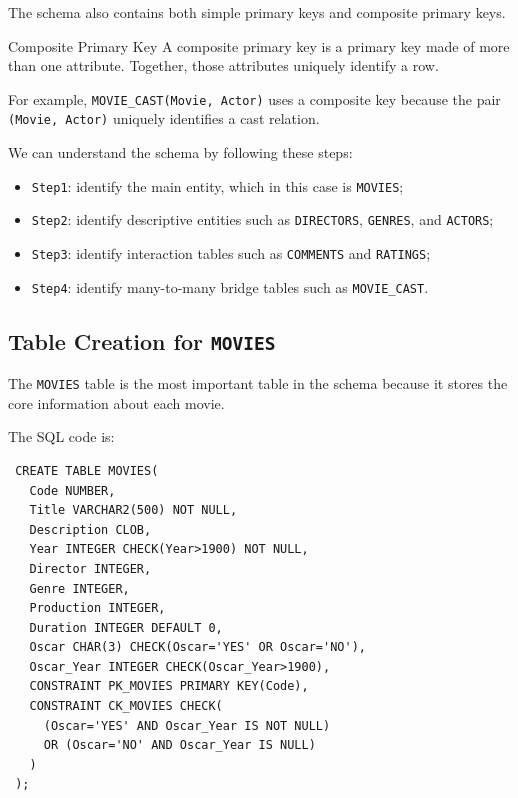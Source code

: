  The schema also contains both simple primary keys and composite primary keys.

 \begin{defbox}{Composite Primary Key}
  A composite primary key is a primary key made of more than one attribute. Together, those attributes uniquely identify a row.
 \end{defbox}

 For example, \texttt{MOVIE\_CAST(Movie, Actor)} uses a composite key because the pair \texttt{(Movie, Actor)} uniquely identifies a cast relation.

 \begin{example}
  We can understand the schema by following these steps:
  \begin{itemize}
   \item \texttt{Step1}: identify the main entity, which in this case is \texttt{MOVIES};
   \vspace{0.2cm}
   \item \texttt{Step2}: identify descriptive entities such as \texttt{DIRECTORS}, \texttt{GENRES}, and \texttt{ACTORS};
   \vspace{0.2cm}
   \item \texttt{Step3}: identify interaction tables such as \texttt{COMMENTS} and \texttt{RATINGS};
   \vspace{0.2cm}
   \item \texttt{Step4}: identify many-to-many bridge tables such as \texttt{MOVIE\_CAST}.
  \end{itemize}
 \end{example}

 \subsection{Table Creation for \texttt{MOVIES}}

 The \texttt{MOVIES} table is the most important table in the schema because it stores the core information about each movie.

 The SQL code is:

 \begin{verbatim}
 CREATE TABLE MOVIES(
   Code NUMBER,
   Title VARCHAR2(500) NOT NULL,
   Description CLOB,
   Year INTEGER CHECK(Year>1900) NOT NULL,
   Director INTEGER,
   Genre INTEGER,
   Production INTEGER,
   Duration INTEGER DEFAULT 0,
   Oscar CHAR(3) CHECK(Oscar='YES' OR Oscar='NO'),
   Oscar_Year INTEGER CHECK(Oscar_Year>1900),
   CONSTRAINT PK_MOVIES PRIMARY KEY(Code),
   CONSTRAINT CK_MOVIES CHECK(
     (Oscar='YES' AND Oscar_Year IS NOT NULL)
     OR (Oscar='NO' AND Oscar_Year IS NULL)
   )
 );
 \end{verbatim}
 \vspace{-0.4cm}


